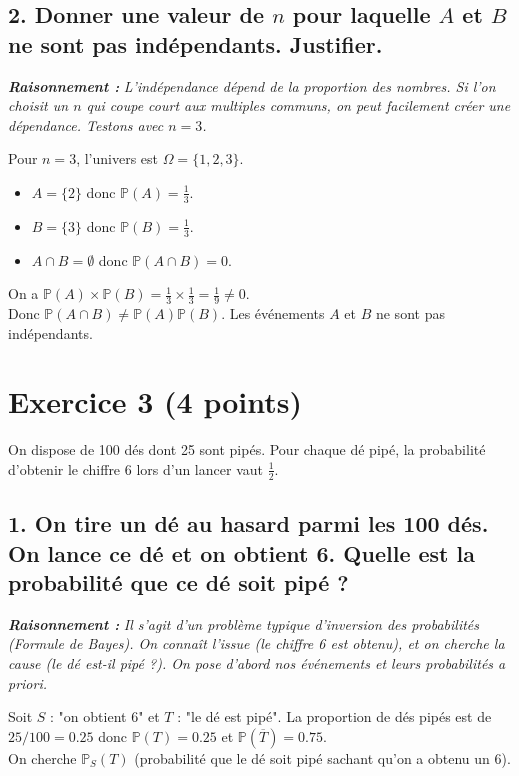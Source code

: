 \documentclass[11pt,a4paper]{article}
\newcommand{\explication}[1]{
    \vspace{0.2cm}
    \noindent\textcolor{blue!80!black}{
        \textbf{\textit{Raisonnement : }} \textit{#1}
    }
    \vspace{0.2cm}
}
\begin{document}
\subsection*{2. Donner une valeur de $n$ pour laquelle $A$ et $B$ ne sont pas indépendants. Justifier.}

\explication{L'indépendance dépend de la proportion des nombres. Si l'on choisit un $n$ qui coupe court aux multiples communs, on peut facilement créer une dépendance. Testons avec $n=3$.}

Pour $n=3$, l'univers est $\Omega = \{1,2,3\}$.
\begin{itemize}
    \item $A = \{2\}$ donc $\mathbb{P}(A) = \frac{1}{3}$.
    \item $B = \{3\}$ donc $\mathbb{P}(B) = \frac{1}{3}$.
    \item $A \cap B = \emptyset$ donc $\mathbb{P}(A \cap B) = 0$.
\end{itemize}
On a $\mathbb{P}(A) \times \mathbb{P}(B) = \frac{1}{3} \times \frac{1}{3} = \frac{1}{9} \neq 0$. \\
Donc $\mathbb{P}(A \cap B) \neq \mathbb{P}(A)\mathbb{P}(B)$. Les événements $A$ et $B$ ne sont pas indépendants.

\vspace{0.5cm}

\section*{Exercice 3 (4 points)}
On dispose de 100 dés dont 25 sont pipés. Pour chaque dé pipé, la probabilité d'obtenir le chiffre 6 lors d'un lancer vaut $\frac{1}{2}$.

\subsection*{1. On tire un dé au hasard parmi les 100 dés. On lance ce dé et on obtient 6. Quelle est la probabilité que ce dé soit pipé ?}

\explication{Il s'agit d'un problème typique d'inversion des probabilités (Formule de Bayes). On connaît l'issue (le chiffre 6 est obtenu), et on cherche la cause (le dé est-il pipé ?). On pose d'abord nos événements et leurs probabilités a priori.}

Soit $S$ : "on obtient 6" et $T$ : "le dé est pipé".
La proportion de dés pipés est de $25/100 = 0.25$ donc $\mathbb{P}(T) = 0.25$ et $\mathbb{P}(\overline{T}) = 0.75$. \\
On cherche $\mathbb{P}_S(T)$ (probabilité que le dé soit pipé sachant qu'on a obtenu un 6).
\end{document}

